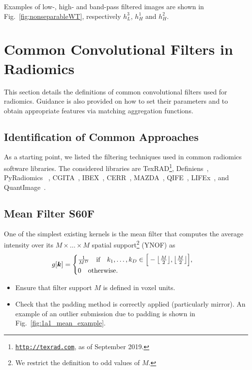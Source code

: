 \documentclass[fleqn,a4paper,oneside,openany]{book}
\DeclarePairedDelimiter\floor{\lfloor}{\rfloor}
\newcommand\id[1]{{\hfill\normalsize{\idfont #1}}}
\newcommand\textid[1]{{\normalsize{\idfont #1}}}
\begin{document}
Examples of low-, high- and band-pass filtered images are shown in Fig.~\ref{fig:nonseparableWT}, respectively $h_L^3$, $h_H^1$ and $h_H^2$.
%
\chapter{Common Convolutional Filters in Radiomics}\label{sec:filtersDescription}
%
This section details the definitions of common convolutional filters used for radiomics. Guidance is also provided on how to set their parameters and to obtain appropriate features via matching aggregation functions.
%
\section{Identification of Common Approaches}
%
As a starting point, we listed the filtering techniques used in common radiomics software libraries. 
The considered libraries are TexRAD\footnote{\texttt{\url{http://texrad.com}}, as of September 2019.}, Definiens~\cite{BGW2014}, PyRadiomics~\cite{Van_Griethuysen2017-qp} , CGITA~\cite{FLS2014}, IBEX~\cite{ZFF2015}, CERR~\cite{Apte2018-sf}, MAZDA~\cite{SzK2017}, QIFE~\cite{EBR2017}, LIFEx~\cite{Nioche2018-jr}, and QuantImage~\cite{DCS2017}.
%
\section[Mean Filter]{Mean Filter \id{S60F}} \label{subsec:meanFilter}
%
One of the simplest existing kernels is the mean filter that computes the average intensity over its $M\times\dots\times M$ spatial support\footnote{We restrict the definition to odd values of $M$.} (\textid{YNOF}) as
%
\begin{equation}\label{eq:meanFilter}
g[\boldsymbol{k}]= 
\begin{cases}
\frac{1}{M^D} \quad\text{if}\quad k_1,\dots,k_D \in  \Big[ -\floor*{\frac{M}{2}},\floor*{\frac{M}{2}} \Big],\\
0\quad\text{otherwise}.
\end{cases}
\end{equation}
%

\vspace{2mm}
\begin{tcolorbox}[width=150mm, halign=left, colframe=black, colback=white, boxsep=0mm, arc=3mm, colframe=black!50!white,
title=Implementation Troubleshooting, title filled=true, fonttitle=\bfseries]
\begin{itemize}
\itemsep0em 
\item Ensure that filter support $M$ is defined in voxel units. 
\item Check that the padding method is correctly applied (particularly mirror). An example of an outlier submission due to padding is shown in Fig.\ \ref{fig:1a1_mean_example}.
\end{itemize}
\end{tcolorbox}
\end{document}
